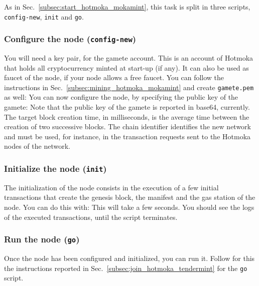 As in Sec.~\ref{subsec:start_hotmoka_mokamint}, this task is split in three scripts,
\texttt{config-new}, \texttt{init} and \texttt{go}.

\subsubsection{Configure the node (\texttt{config-new})}\label{subsubsec:tendermint_config_new}

You will need a key pair, for the gamete account.
This is an account of Hotmoka that holds all cryptocurrency minted at start-up (if any).
It can also be used as faucet of the node, if your node allows a free faucet.
You can follow the instructions in Sec.~\ref{subsec:mining_hotmoka_mokamint} and create
\texttt{gamete.pem} as well:
%
%
You can now configure the node, by specifying the public key of the gamete:
%
%
Note that the public key of the gamete is reported in base64, currently.
The target block creation time, in milliseconds, is the average time between
the creation of two successive blocks. The chain identifier identifies
the new network and must be used, for instance, in the transaction
requests sent to the Hotmoka nodes of the network.

\subsubsection{Initialize the node (\texttt{init})}\label{subsubsec:tendermint_init_node}

The initialization of the node consists in the execution of a few initial transactions
that create the genesis block, the manifest and the gas station of the node. You can do this with:
%
%
This will take a few seconds. You should see the logs of the executed transactions,
until the script terminates.

\subsubsection{Run the node (\texttt{go})}\label{subsubsec:tendermint_go_new_node}

Once the node has been configured and initialized, you can run it.
Follow for this the instructions reported in Sec.~\ref{subsec:join_hotmoka_tendermint}
for the \texttt{go} script.

